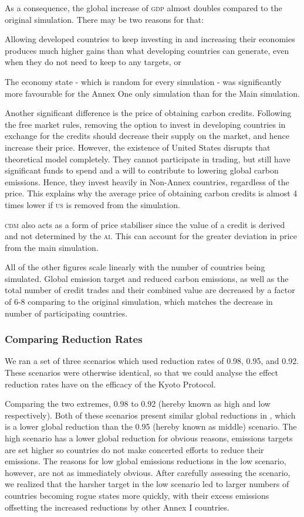 As a consequence, the global increase of \textsc{gdp} almost doubles compared to the original simulation. There may be two reasons for that:

Allowing developed countries to keep investing in and increasing their economies produces much higher gains than what developing countries can generate, even when they do not need to keep to any targets, or

The economy state - which is random for every simulation - was significantly more favourable for the Annex One only simulation than for the Main simulation.

Another significant difference is the price of obtaining carbon credits. Following the free market rules, removing the option to invest in developing countries in exchange for the credits should decrease their supply on the market, and hence increase their price. However, the existence of United States disrupts that theoretical model completely. They cannot participate in trading, but still have significant funds to spend and a will to contribute to lowering global carbon emissions. Hence, they invest heavily in Non-Annex countries, regardless of the price. This explains why the average price of obtaining carbon credits is almost 4 times lower if \textsc{us} is removed from the simulation.

\textsc{cdm} also acts as a form of price stabiliser since the value of a credit is derived and not determined by the \textsc{ai}.  This can account for the greater deviation in price from the main simulation.

All of the other figures scale linearly with the number of countries being simulated. Global emission target and reduced carbon emissions, as well as the total number of credit trades and their combined value are decreased by a factor of 6-8 comparing to the original simulation, which matches the decrease in number of participating countries.

\subsubsection{Comparing Reduction Rates}

We ran a set of three scenarios which used reduction rates of 0.98, 0.95, and 0.92. These scenarios were otherwise identical, so that we could analyse the effect reduction rates have on the efficacy of the Kyoto Protocol.

Comparing the two extremes, 0.98 to 0.92 (hereby known as high and low respectively). Both of these scenarios present similar global reductions in \CO, which is a lower global reduction than the 0.95 (hereby known as middle) scenario. The high scenario has a lower global reduction for obvious reasons, emissions targets are set higher so countries do not make concerted efforts to reduce their \CO emissions. The reasons for low global emissions reductions in the low scenario, however, are not as immediately obvious. After carefully assessing the scenario, we realized that the harsher target in the low scenario led to larger numbers of countries becoming rogue states more quickly, with their excess emissions offsetting the increased reductions by other Annex I countries.


